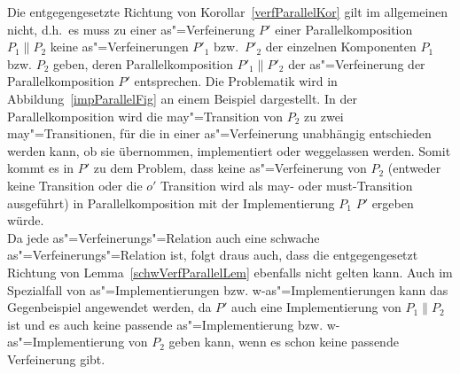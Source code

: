 Die entgegengesetzte Richtung von Korollar~\ref{verfParallelKor} gilt im
allgemeinen nicht, d.h.\ es muss zu einer as"=Verfeinerung $P'$ einer
Parallelkomposition $P_1\|P_2$ keine as"=Verfeinerungen $P'_1$ bzw.\
$P'_2$ der einzelnen Komponenten $P_1$ bzw. $P_2$ geben, deren
Parallelkomposition $P'_1\|P'_2$ der as"=Verfeinerung der Parallelkomposition
$P'$ entsprechen. Die Problematik wird in Abbildung~\ref{impParallelFig} an
einem Beispiel dargestellt. In der Parallelkomposition wird die may"=Transition
von $P_2$ zu zwei may"=Transitionen, für die in einer as"=Verfeinerung
unabhängig entschieden werden kann, ob sie übernommen, implementiert oder
weggelassen werden. Somit kommt es in $P'$ zu dem Problem, dass keine
as"=Verfeinerung von $P_2$ (entweder keine Transition oder die $o'$ Transition
wird als may- oder must-Transition ausgeführt) in Parallelkomposition mit der
Implementierung $P_1$ $P'$ ergeben würde.\\
Da jede as"=Verfeinerungs"=Relation auch eine schwache
as"=Verfeinerungs"=Relation ist, folgt draus auch, dass die entgegengesetzt
Richtung von Lemma~\ref{schwVerfParallelLem} ebenfalls nicht gelten kann. Auch
im Spezialfall von as"=Implementierungen bzw. w-as"=Implementierungen kann das
Gegenbeispiel angewendet werden, da $P'$ auch eine Implementierung von
$P_1\|P_2$ ist und es auch keine passende as"=Implementierung bzw.
w-as"=Implementierung von $P_2$ geben kann, wenn es schon keine passende
Verfeinerung gibt.

